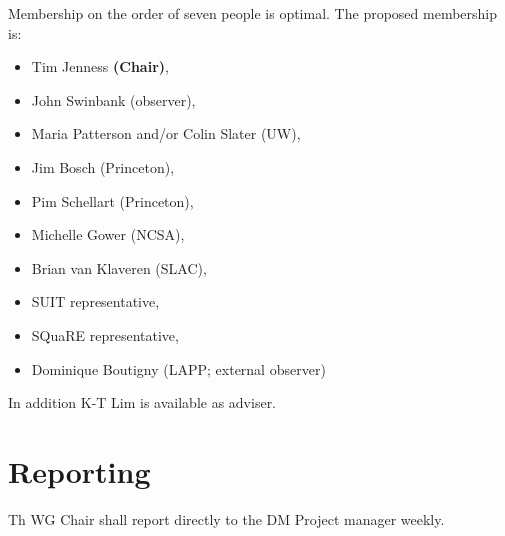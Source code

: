 Membership on the order of seven people is optimal.
The proposed membership is:

\begin{itemize}
  \item Tim Jenness \textbf{(Chair)},
  \item John Swinbank (observer),
  \item Maria Patterson and/or Colin Slater (UW),
  \item Jim Bosch (Princeton),
  \item Pim Schellart (Princeton),
  \item Michelle Gower (NCSA),
  \item Brian van Klaveren (SLAC),
  \item SUIT representative,
  \item SQuaRE representative,
  \item Dominique Boutigny (LAPP; external observer)
\end{itemize}

In addition K-T Lim is available as adviser.

\section{Reporting}

Th WG Chair shall report directly to the DM Project manager weekly.
